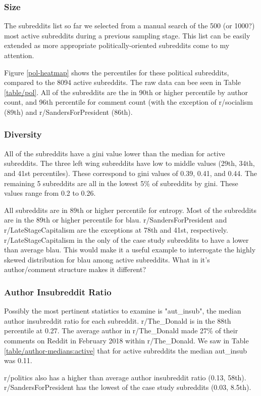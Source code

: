 \begin{landscape}

\end{landscape}

\subsubsection{Size}
The subreddits list so far we selected from a manual search of the 500 (or 1000?) most active subreddits during a previous sampling stage. This list can be easily extended as more appropriate politically-oriented subreddits come to my attention.

Figure \ref{pol-heatmap} shows the percentiles for  these political subreddits, compared to the 8094 active subreddits. The raw data can bee seen in Table \ref{table/pol}. All of the subreddits are the in 90th or higher percentile by author count, and 96th percentile for comment count (with the exception of r/socialism (89th) and r/SandersForPresident (86th). 

\subsubsection{Diversity}
All of the subreddits have a gini value lower than the median for active subreddits. The three left wing subreddits have low to middle values (29th, 34th, and 41st percentiles). These correspond to gini values of 0.39, 0.41, and 0.44. The remaining 5 subreddits are all in the lowest 5\% of subreddits by gini. These values range from 0.2 to 0.26. 

All subreddits are in 89th or higher percentile for entropy. Most of the subreddits are in the 89th or higher percentile for blau. r/SandersForPresident and r/LateStageCapitalism are the exceptions at 78th and 41st, respectively. r/LateStageCapitalism in the only of the case study subreddits to have a lower than average blau. This would make it a useful example to interrogate the highly skewed distribution for blau among active subreddits. What in it's author/comment structure makes it different?


\subsubsection{Author Insubreddit Ratio}
Possibly the most pertinent statistics to examine is "aut\_insub", the median author insubreddit ratio for each subreddit. r/The\_Donald is in the 88th percentile at 0.27. The average author in r/The\_Donald made 27\% of their comments on Reddit in February 2018 within r/The\_Donald. We saw in Table \ref{table/author-medians:active} that for active subreddits the median aut\_insub was 0.11.

r/politics also has a higher than average author insubreddit ratio (0.13, 58th). r/SandersForPresident has the lowest of the case study subreddits (0.03, 8.5th).